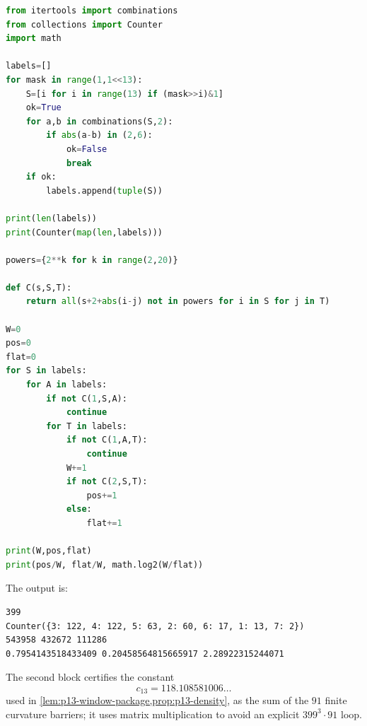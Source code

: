 \documentclass[11pt]{article}
\begin{document}
\begin{lstlisting}[language=Python]
from itertools import combinations
from collections import Counter
import math

labels=[]
for mask in range(1,1<<13):
    S=[i for i in range(13) if (mask>>i)&1]
    ok=True
    for a,b in combinations(S,2):
        if abs(a-b) in (2,6):
            ok=False
            break
    if ok:
        labels.append(tuple(S))

print(len(labels))
print(Counter(map(len,labels)))

powers={2**k for k in range(2,20)}

def C(s,S,T):
    return all(s+2+abs(i-j) not in powers for i in S for j in T)

W=0
pos=0
flat=0
for S in labels:
    for A in labels:
        if not C(1,S,A):
            continue
        for T in labels:
            if not C(1,A,T):
                continue
            W+=1
            if not C(2,S,T):
                pos+=1
            else:
                flat+=1

print(W,pos,flat)
print(pos/W, flat/W, math.log2(W/flat))
\end{lstlisting}

The output is:
\begin{lstlisting}
399
Counter({3: 122, 4: 122, 5: 63, 2: 60, 6: 17, 1: 13, 7: 2})
543958 432672 111286
0.7954143518433409 0.20458564815665917 2.28922315244071
\end{lstlisting}

The second block certifies the constant
\[
 c_{13}=118.108581006\ldots
\]
used in \cref{lem:p13-window-package,prop:p13-density}, as the sum of the
$91$ finite curvature barriers; it uses matrix multiplication to avoid an
explicit $399^3\cdot91$ loop.
\end{document}
